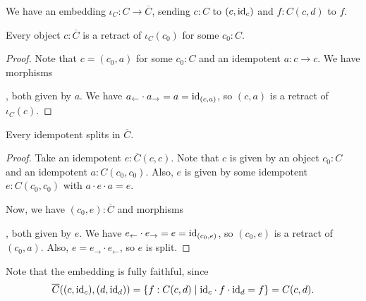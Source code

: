 \begin{definition}
  We have an embedding $ \iota_C: C \to \overline C $, sending $ c: C $ to $ (c, \text{id}_{c}) $ and $ f: C(c, d) $ to $ f $.
\end{definition}

\begin{lemma}
  Every object $ c: \overline C $ is a retract of $ \iota_C(c_0) $ for some $ c_0: C $.
\end{lemma}
\begin{proof}
  Note that $ c = (c_0, a) $ for some $ c_0: C $ and an idempotent $ a: c \to c $. We have morphisms
  , both given by $ a $. We have $ a_\leftarrow \cdot a_\rightarrow = a = \text{id}_{(c, a)} $, so $ (c, a) $ is a retract of $ \iota_C(c) $.
\end{proof}

\begin{lemma}
  Every idempotent splits in $ \overline C $.
\end{lemma}
\begin{proof}
  Take an idempotent $ e: \overline C(c, c) $. Note that $ c $ is given by an object $ c_0: C $ and an idempotent $ a: C(c_0, c_0) $. Also, $ e $ is given by some idempotent $ e: C(c_0, c_0) $ with $ a \cdot e \cdot a = e $.

  Now, we have $ (c_0, e): \overline C $ and morphisms
  , both given by $ e $. We have $ e_\leftarrow \cdot e_\rightarrow = e = \text{id}_{(c_0, e)} $, so $ (c_0, e) $ is a retract of $ (c_0, a) $. Also, $ e = e_\rightarrow \cdot e_\leftarrow $, so $ e $ is split.
\end{proof}

\begin{remark}
  Note that the embedding is fully faithful, since
  \[ \overline C((c, \text{id}_{c}), (d, \text{id}_{d})) = \{ f: C(c, d) \mid \text{id}_{c} \cdot f \cdot \text{id}_{d} = f \} = C(c, d). \]
\end{remark}

